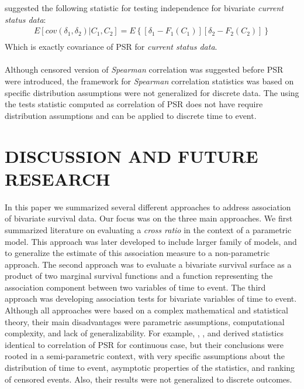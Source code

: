 \documentclass[]{article}
\begin{document}
\cite{ding2004testing} suggested the following statistic for testing independence for bivariate \emph{current status data}:
	$$
	\begin{aligned}
		 E[cov(\delta_1, \delta_2)|C_1,C_2] = E\left\{ [\delta_1 - F_1(C_1)][\delta_2 - F_2(C_2)]  \right\}\\
	\end{aligned}
	$$
Which is exactly covariance of PSR for \emph{current status data}.\\
~\\
Although censored version of \emph{Spearman} correlation was suggested before PSR were introduced, the framework for \emph{Spearman} correlation statistics was based on specific distribution assumptions were not generalized for discrete data. The using the tests statistic computed as correlation of PSR does not have require distribution assumptions and can be applied to discrete time to event.

\section{DISCUSSION AND FUTURE RESEARCH}

In this paper we summarized several different approaches to address association of bivariate survival data. Our focus was on the three main approaches. We first summarized literature on evaluating a \emph{cross ratio} in the context of a parametric model. This approach was later developed to include larger family of models, and to generalize the estimate of this association measure to a non-parametric approach. The second approach was to evaluate a bivariate survival surface as a product of two marginal survival functions and a function representing the association component between two variables of time to event. The third approach was developing association tests for bivariate variables of time to event.\\

Although all approaches were based on a complex mathematical and statistical theory, their main disadvantages were parametric assumptions, computational complexity, and lack of generalizability. For example, \cite{cuzick1982rank}, \cite{dabrowska1988kaplan}, and \cite{ding2004testing} derived statistics identical to correlation of PSR for continuous case, but their conclusions were rooted in a semi-parametric context, with very specific assumptions about the distribution of time to event, asymptotic properties of the statistics, and ranking of censored events. Also, their results were not generalized to discrete outcomes.\\
\end{document}
